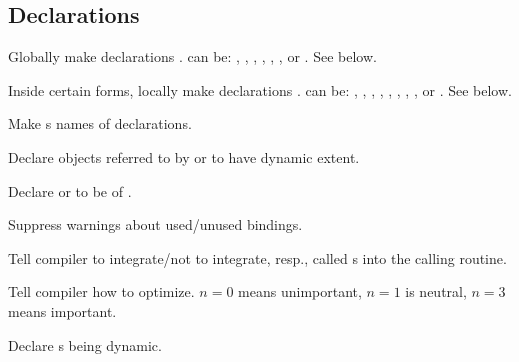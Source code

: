\subsection{Declarations}
\begin{LIST}{1cm}

  Globally make declarations .  can be:
  ,      
  ,           
  ,   
  ,
  ,
  , or
  . See below.

  Inside certain forms, locally make declarations .  can be:
  ,
  ,           
  ,       
  ,     
  ,     
  ,  
  ,  
  , or
  . See below.      
  
  \begin{LIST}{.5cm}
    
    Make s names of declarations.
    
    Declare objects referred to by  or  to have
    dynamic extent. 

    Declare  or  to be of .

    Suppress warnings about used/unused bindings.

    Tell compiler to integrate/not to integrate, resp., called
    s into the calling routine.

    Tell compiler how to optimize. $n=0$ means unimportant, $n=1$ is
    neutral, $n=3$ means important.

    Declare s being dynamic.

  \end{LIST}
\end{LIST}



